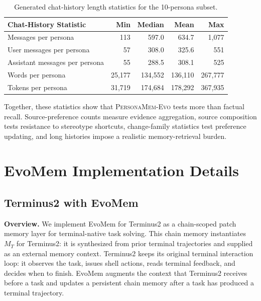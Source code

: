 \documentclass{llmxive}
\begin{document}
\begin{table}[!htbp]
\centering
\small
\begin{tabular}{lrrrr}
\toprule
\textbf{Chat-History Statistic} & \textbf{Min} & \textbf{Median} & \textbf{Mean} & \textbf{Max} \\
\midrule
Messages per persona & 113 & 597.0 & 634.7 & 1,077 \\
User messages per persona & 57 & 308.0 & 325.6 & 551 \\
Assistant messages per persona & 55 & 288.5 & 308.1 & 525 \\
Words per persona & 25,177 & 134,552 & 136,110 & 267,777 \\
Tokens per persona & 31,719 & 174,684 & 178,292 & 367,935 \\
\bottomrule
\end{tabular}
\caption{Generated chat-history length statistics for the 10-persona subset.}
\label{tab:personamem_evo_context_length}
\end{table}

Together, these statistics show that \textsc{PersonaMem-Evo} tests more than factual recall. Source-preference counts measure evidence aggregation, source composition tests resistance to stereotype shortcuts, change-family statistics test preference updating, and long histories impose a realistic memory-retrieval burden.





\section{EvoMem Implementation Details}
\label{appendix:evomem_implement}


\subsection{Terminus2 with EvoMem}
\label{sec:evomem_terminus2}

\textbf{Overview.}
We implement EvoMem for Terminus2 as a chain-scoped patch memory layer for terminal-native task solving. This chain memory instantiates $M_T$ for Terminus2: it is synthesized from prior terminal trajectories and supplied as an external memory context. Terminus2 keeps its original terminal interaction loop: it observes the task, issues shell actions, reads terminal feedback, and decides when to finish. EvoMem augments the context that Terminus2 receives before a task and updates a persistent chain memory after a task has produced a terminal trajectory.
\end{document}
